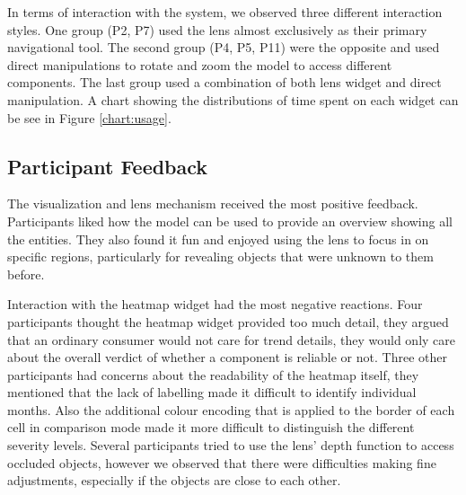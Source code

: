    
In terms of interaction with the system, we observed three different
interaction styles. One group (P2, P7) used the lens almost exclusively
as their primary navigational tool. The second group (P4, P5, P11) were the
opposite and used direct manipulations to rotate and zoom the \threed model to
access different components. The last group used a combination of both lens
widget and direct manipulation. A chart showing the distributions of time spent
on each widget can be see in Figure \ref{chart:usage}.



\subsection{Participant Feedback}
The \threed visualization and lens mechanism received the most positive
feedback. Participants liked how the \threed model can be used to provide 
an overview showing all the entities. They also found it fun and enjoyed using
the lens to focus in on specific regions, particularly for revealing objects
that were unknown to them before.

Interaction with the heatmap widget had the most negative reactions. Four
participants thought the heatmap widget provided too much detail, they argued
that an ordinary consumer would not care for trend details, they would only care
about the overall verdict of whether a component is reliable or not. Three other
participants had concerns about the readability of the heatmap itself, they
mentioned that the lack of labelling made it difficult to identify individual
months. Also the additional colour encoding that is applied to the border of each
cell in comparison mode made it more difficult to distinguish the different
severity levels. Several participants tried to use the lens' depth function to access
occluded objects, however we observed that there were difficulties making fine
adjustments, especially if the objects are close to each other. 
  
